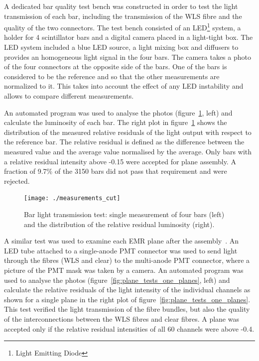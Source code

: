 \documentclass[a4paper,11pt]{article}
\begin{document}
A dedicated bar quality test bench was constructed in order to test the light transmission of each bar, including the transmission of the WLS fibre and the
quality of the two connectors. The test bench consisted of an LED\footnote{Light Emitting Diode} system, a holder for 4 scintillator bars and a digital camera placed in a light-tight box. 
The LED system included a blue LED source, a light mixing box and diffusers to provides an homogeneous light signal in the four bars. The camera takes a photo of the four connectors at the opposite side of the bars. One of the bars is considered to be the
reference and so that the other measurements are normalized to it. This takes into account the effect of any LED instability and allows to
compare different measurements. 

An automated program was used to analyse the photos (figure~\ref{fig:measurements}, left) and calculate the luminosity
of each bar. The right plot in figure~\ref{fig:measurements} shows the distribution of the measured relative residuals of the light output with respect to the reference bar. The relative
residual is defined as the difference between the measured value and the average value normalised by the average. Only bars with a relative residual
intensity above -0.15 were accepted for plane assembly. A fraction of 9.7\% of the 3150 bars did not pass that requirement and were rejected.

\begin{figure}[htb]
 \centering
 \texttt{[image: ./measurements\_cut]}
 \caption[Bar quality test measurements]{Bar light transmission test: single measurement of four bars (left) and the distribution of the relative residual luminosity (right).}
 \label{fig:measurements}
\end{figure}

A similar test was used to examine each EMR plane after the assembly~\cite{emr_elquality}. An LED tube attached to a single-anode PMT connector was used to send light through
the fibres (WLS and clear) to the multi-anode PMT connector, where a picture of the PMT mask was taken by a camera. An automated
program was used to analyse the photos (figure~\ref{fig:plane_tests_one_planes}, left) and calculate the relative residuals of the light intensity
of the individual channels as shown for a single plane in the right plot of figure~\ref{fig:plane_tests_one_planes}. This test verified the light transmission of the fibre bundles, but also
the quality of the interconnections between the WLS fibres and clear fibres. A plane was accepted only if the relative residual intensities of all 60
channels were above -0.4.
\end{document}
